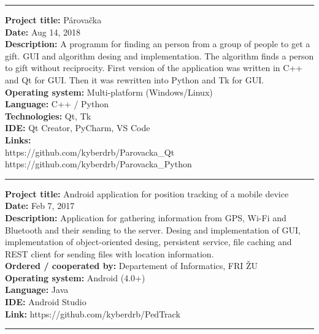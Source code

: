 \documentclass{article}
\begin{document}
\begin{center}\rule{3in}{0.4pt}\end{center}

\noindent
\textbf{Project title:} Párovačka\\
\textbf{Date:} Aug 14, 2018\\
\textbf{Description:} A programm for finding an person from a
group of people to get a gift. GUI and algorithm desing and
implementation. The algorithm finds a person to gift without
reciprocity. First version of the application was written in C++ and Qt
for GUI. Then it was rewritten into Python and Tk for
GUI.\\
\textbf{Operating system:} Multi-platform (Windows/Linux)\\
\textbf{Language:} C++ / Python\\
\textbf{Technologies:} Qt, Tk\\
\textbf{IDE:} Qt Creator, PyCharm, VS
Code\\
\textbf{Links:}\\
https://github.com/kyberdrb/Parovacka\_Qt\\
https://github.com/kyberdrb/Parovacka\_Python

\begin{center}\rule{3in}{0.4pt}\end{center}

\noindent
\textbf{Project title:} Android application for position tracking of a mobile device\\
\textbf{Date:} Feb 7, 2017\\
\textbf{Description:} Application for gathering information from GPS, Wi-Fi and Bluetooth and
their sending to the server. Desing and implementation of GUI,
implementation of object-oriented desing, persistent service, file
caching and REST client for sending files with location
information.\\
\textbf{Ordered / cooperated by:} Departement of Informatics, FRI ŽU\\
\textbf{Operating system:} Android (4.0+)\\
\textbf{Language:} Java\\
\textbf{IDE:} Android Studio\\
\textbf{Link:} https://github.com/kyberdrb/PedTrack

\begin{center}\rule{3in}{0.4pt}\end{center}
\end{document}
